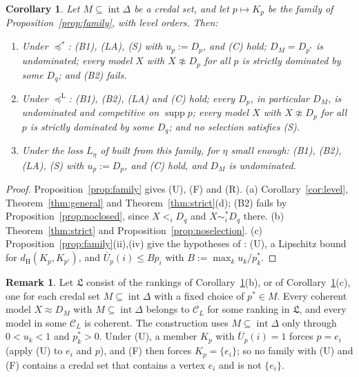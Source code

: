 \documentclass[11pt]{article}
\newtheorem{corollary}[theorem]{Corollary}
\theoremstyle{definition}
\newtheorem{remark}[theorem]{Remark}
\newcommand{\supp}{\operatorname{supp}}
\newcommand{\dH}{d_{\mathrm H}}
\newcommand{\Ub}{\overline U}
\newcommand{\ws}{\preceq^{*}}
\newcommand{\wst}{\sim^{*}}
\newcommand{\wl}{\preceq^{\mathrm L}}
\begin{document}
\begin{corollary}\label{cor:main}
Let $M\subseteq\operatorname{int}\Delta$ be a credal set, and let $p\mapsto K_p$ be the family of Proposition~\ref{prop:family}, with level orders. Then:
\begin{enumerate}[label=(\alph*)]
\item Under $\ws$: (B1), (LA), (S) with $u_p:=D_p$, and (C) hold; $D_M=D_{p^*}$ is undominated; every model $X$ with $X\not\approx D_p$ for all $p$ is strictly dominated by some $D_q$; and (B2) fails.
\item Under $\wl$: (B1), (B2), (LA) and (C) hold; every $D_p$, in particular $D_M$, is undominated and competitive on $\supp p$; every model $X$ with $X\not\approx D_p$ for all $p$ is strictly dominated by some $D_q$; and no selection satisfies (S).
\item Under the loss $L_\eta$ of \cite[Theorem~2.2]{LR} built from this family, for $\eta$ small enough: (B1), (B2), (LA), (S) with $u_p:=D_p$, and (C) hold, and $D_M$ is undominated.
\end{enumerate}
\end{corollary}

\begin{proof}
Proposition~\ref{prop:family} gives (U), (F) and (R). (a) Corollary~\ref{cor:level}, Theorem~\ref{thm:general} and Theorem~\ref{thm:strict}(d); (B2) fails by Proposition~\ref{prop:noclosed}, since $X<_iD_q$ and $X\wst_iD_q$ there. (b) Theorem~\ref{thm:strict} and Proposition~\ref{prop:noselection}. (c) Proposition~\ref{prop:family}(ii),(iv) give the hypotheses of \cite[Theorem~2.2]{LR}: (U), a Lipschitz bound for $\dH(K_p,K_{p'})$, and $\Ub_p(i)\le Bp_i$ with $B:=\max_ku_k/p^*_k$.
\end{proof}

\begin{remark}\label{rem:class}
Let $\mathfrak L$ consist of the rankings of Corollary~\ref{cor:main}(b), or of Corollary~\ref{cor:main}(c), one for each credal set $M\subseteq\operatorname{int}\Delta$ with a fixed choice of $p^*\in M$. Every coherent model $X\approx D_M$ with $M\subseteq\operatorname{int}\Delta$ belongs to $\mathcal C_L$ for some ranking in $\mathfrak L$, and every model in some $\mathcal C_L$ is coherent. The construction uses $M\subseteq\operatorname{int}\Delta$ only through $0<u_k<1$ and $p^*_k>0$. Under (U), a member $K_{p}$ with $\Ub_p(i)=1$ forces $p=e_i$ (apply (U) to $e_i$ and $p$), and (F) then forces $K_p=\{e_i\}$; so no family with (U) and (F) contains a credal set that contains a vertex $e_i$ and is not $\{e_i\}$.
\end{remark}
\end{document}
